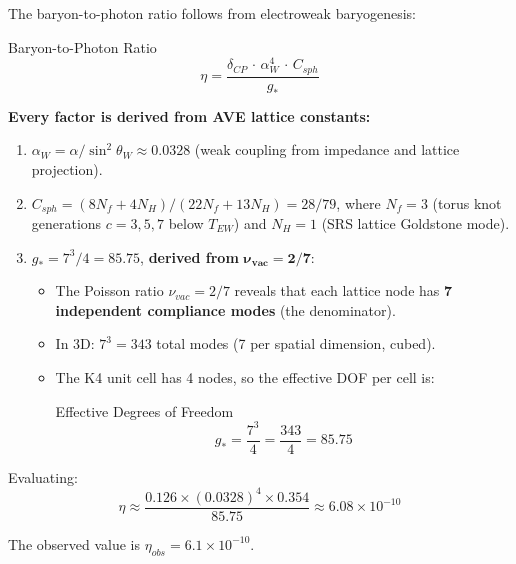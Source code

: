The baryon-to-photon ratio follows from electroweak baryogenesis:
\begin{resultbox}{Baryon-to-Photon Ratio}
\begin{equation}
    \eta = \frac{\delta_{CP} \,\cdot\, \alpha_W^4 \,\cdot\,
    C_{sph}}{g_*}
    \label{eq:eta_baryon}
\end{equation}
\end{resultbox}

\textbf{Every factor is derived from AVE lattice constants:}

\begin{enumerate}
    \item $\alpha_W = \alpha/\sin^2\theta_W \approx 0.0328$
    (weak coupling from impedance and lattice projection).

    \item $C_{sph} = (8N_f + 4N_H)/(22N_f + 13N_H) = 28/79$,
    where $N_f = 3$ (torus knot generations $c=3,5,7$ below
    $T_{EW}$) and $N_H = 1$ (SRS lattice Goldstone mode).

    \item $g_* = 7^3/4 = 85.75$, \textbf{derived from}
    $\boldsymbol{\nu_{vac} = 2/7}$:
    \begin{itemize}
        \item The Poisson ratio $\nu_{vac} = 2/7$ reveals that
        each lattice node has \textbf{7 independent compliance modes}
        (the denominator).
        \item In 3D: $7^3 = 343$ total modes (7 per spatial
        dimension, cubed).
        \item The K4 unit cell has 4 nodes, so the effective DOF
        per cell is:
        \begin{resultbox}{Effective Degrees of Freedom}
        \begin{equation}
            g_* = \frac{7^3}{4} = \frac{343}{4} = 85.75
            \label{eq:g_star_ave}
        \end{equation}
        \end{resultbox}
    \end{itemize}
\end{enumerate}

Evaluating:
\begin{equation}
    \eta \approx \frac{0.126 \times (0.0328)^4 \times 0.354}{85.75}
    \approx 6.08 \times 10^{-10}
\end{equation}

The observed value is $\eta_{obs} = 6.1 \times 10^{-10}$.

